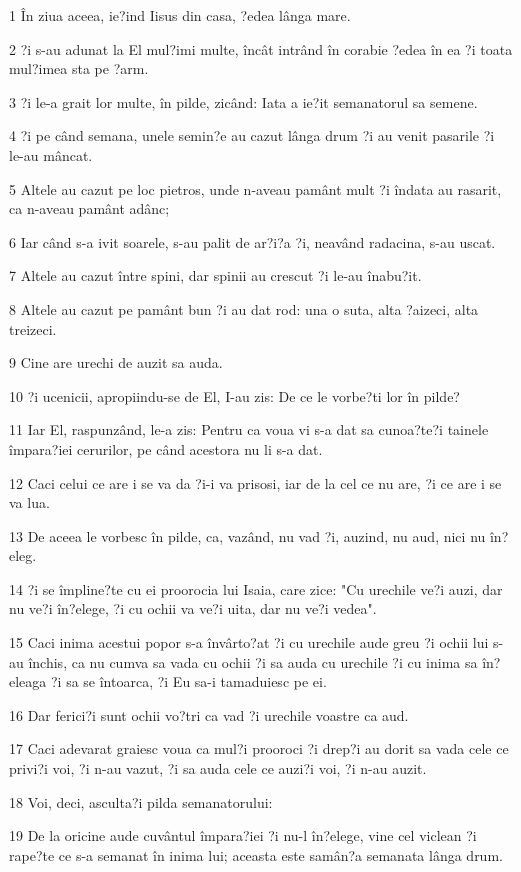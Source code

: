 \par 1 În ziua aceea, ie?ind Iisus din casa, ?edea lânga mare.
\par 2 ?i s-au adunat la El mul?imi multe, încât intrând în corabie ?edea în ea ?i toata mul?imea sta pe ?arm.
\par 3 ?i le-a grait lor multe, în pilde, zicând: Iata a ie?it semanatorul sa semene.
\par 4 ?i pe când semana, unele semin?e au cazut lânga drum ?i au venit pasarile ?i le-au mâncat.
\par 5 Altele au cazut pe loc pietros, unde n-aveau pamânt mult ?i îndata au rasarit, ca n-aveau pamânt adânc;
\par 6 Iar când s-a ivit soarele, s-au palit de ar?i?a ?i, neavând radacina, s-au uscat.
\par 7 Altele au cazut între spini, dar spinii au crescut ?i le-au înabu?it.
\par 8 Altele au cazut pe pamânt bun ?i au dat rod: una o suta, alta ?aizeci, alta treizeci.
\par 9 Cine are urechi de auzit sa auda.
\par 10 ?i ucenicii, apropiindu-se de El, I-au zis: De ce le vorbe?ti lor în pilde?
\par 11 Iar El, raspunzând, le-a zis: Pentru ca voua vi s-a dat sa cunoa?te?i tainele împara?iei cerurilor, pe când acestora nu li s-a dat.
\par 12 Caci celui ce are i se va da ?i-i va prisosi, iar de la cel ce nu are, ?i ce are i se va lua.
\par 13 De aceea le vorbesc în pilde, ca, vazând, nu vad ?i, auzind, nu aud, nici nu în?eleg.
\par 14 ?i se împline?te cu ei proorocia lui Isaia, care zice: "Cu urechile ve?i auzi, dar nu ve?i în?elege, ?i cu ochii va ve?i uita, dar nu ve?i vedea".
\par 15 Caci inima acestui popor s-a învârto?at ?i cu urechile aude greu ?i ochii lui s-au închis, ca nu cumva sa vada cu ochii ?i sa auda cu urechile ?i cu inima sa în?eleaga ?i sa se întoarca, ?i Eu sa-i tamaduiesc pe ei.
\par 16 Dar ferici?i sunt ochii vo?tri ca vad ?i urechile voastre ca aud.
\par 17 Caci adevarat graiesc voua ca mul?i prooroci ?i drep?i au dorit sa vada cele ce privi?i voi, ?i n-au vazut, ?i sa auda cele ce auzi?i voi, ?i n-au auzit.
\par 18 Voi, deci, asculta?i pilda semanatorului:
\par 19 De la oricine aude cuvântul împara?iei ?i nu-l în?elege, vine cel viclean ?i rape?te ce s-a semanat în inima lui; aceasta este samân?a semanata lânga drum.
